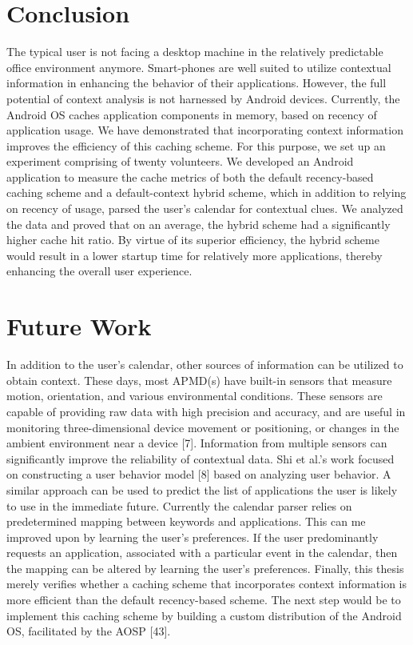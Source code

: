 \documentclass[12pt]{uthesis-v12}  %
\begin{document}
\chapter{Conclusion}
	The typical user is not facing a desktop machine in the relatively predictable office environment anymore. Smart-phones are well suited to utilize contextual information in enhancing the behavior of their applications. However, the full potential of context analysis is not harnessed by Android devices. Currently, the Android OS caches application components in memory, based on recency of application usage. We have demonstrated that incorporating context information improves the efficiency of this caching scheme. For this purpose, we set up an experiment comprising of twenty volunteers. We developed an Android application to measure the cache metrics of both the default recency-based caching scheme and a default-context hybrid scheme, which in addition to relying on recency of usage, parsed the user's calendar for contextual clues. We analyzed the data and proved that on an average, the hybrid scheme had a significantly higher cache hit ratio. By virtue of its superior efficiency, the hybrid scheme would result in a lower startup time for relatively more applications, thereby enhancing the overall user experience.
		
\chapter{Future Work}		
	In addition to the user's calendar, other sources of information can be utilized to obtain context. These days, most APMD(s) have built-in sensors that measure motion, orientation, and various environmental conditions. These sensors are capable of providing raw data with high precision and accuracy, and are useful in monitoring three-dimensional device movement or positioning, or changes in the ambient environment near a device [7]. Information from multiple sensors can significantly improve the reliability of contextual data. Shi et al.'s work focused on constructing a user behavior model [8] based on analyzing user behavior. A similar approach can be used to predict the list of applications the user is likely to use in the immediate future. Currently the calendar parser relies on predetermined mapping between keywords and applications. This can me improved upon by learning the user's preferences. If the user predominantly requests an application, associated with a particular event in the calendar, then the mapping can be altered by learning the user's preferences. Finally, this thesis merely verifies whether a caching scheme that incorporates context information is more efficient than the default recency-based scheme. The next step would be to implement this caching scheme by building a custom distribution of the Android OS, facilitated by the AOSP [43].
\end{document}
